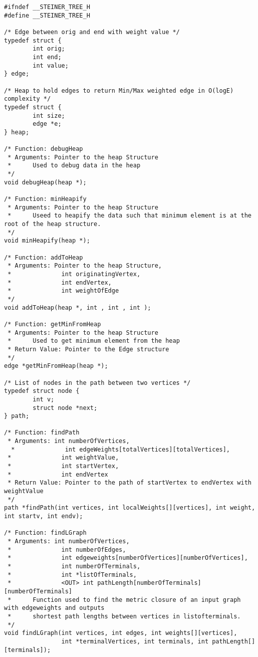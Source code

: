 \documentclass[a4paper]{article}
\begin{document}
\begin{lstlisting}
#ifndef __STEINER_TREE_H
#define __STEINER_TREE_H

/* Edge between orig and end with weight value */
typedef struct {
        int orig;
        int end;
        int value;
} edge;

/* Heap to hold edges to return Min/Max weighted edge in O(logE) complexity */
typedef struct {
        int size;
        edge *e;
} heap;

/* Function: debugHeap
 * Arguments: Pointer to the heap Structure
 *      Used to debug data in the heap
 */
void debugHeap(heap *);

/* Function: minHeapify
 * Arguments: Pointer to the heap Structure
 *      Useed to heapify the data such that minimum element is at the root of the heap structure.
 */
void minHeapify(heap *);

/* Function: addToHeap
 * Arguments: Pointer to the heap Structure,
 *              int originatingVertex,
 *              int endVertex,
 *              int weightOfEdge
 */
void addToHeap(heap *, int , int , int );

/* Function: getMinFromHeap
 * Arguments: Pointer to the heap Structure
 *      Used to get minimum element from the heap
 * Return Value: Pointer to the Edge structure
 */
edge *getMinFromHeap(heap *);

/* List of nodes in the path between two vertices */
typedef struct node {
        int v;
        struct node *next;
} path;

/* Function: findPath
 * Arguments: int numberOfVertices,
  *              int edgeWeights[totalVertices][totalVertices],
 *              int weightValue,
 *              int startVertex,
 *              int endVertex
 * Return Value: Pointer to the path of startVertex to endVertex with weightValue
 */
path *findPath(int vertices, int localWeights[][vertices], int weight, int startv, int endv);

/* Function: findLGraph
 * Arguments: int numberOfVertices,
 *              int numberOfEdges,
 *              int edgeweights[numberOfVertices][numberOfVertices],
 *              int numberOfTerminals,
 *              int *listOfTerminals,
 *              <OUT> int pathLength[numberOfTerminals][numberOfTerminals]
 *      Function used to find the metric closure of an input graph with edgeweights and outputs
 *      shortest path lengths between vertices in listofterminals.
 */
void findLGraph(int vertices, int edges, int weights[][vertices],
                int *terminalVertices, int terminals, int pathLength[][terminals]);


\end{lstlisting}
\end{document}
